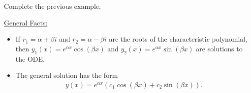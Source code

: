 \documentclass[12pt,a4paper]{article}
\newcounter{example}[section]
\begin{document}
	\vfill
	
\newpage

\begin{example}
Complete the previous example.
\end{example}

\newpage

\phantom{2}

\vfill

\underline{General Facts:}
	\begin{itemize}
	\item If $r_1 = \alpha + \beta i$ and $r_2 = \alpha - \beta i$ are the roots of the characteristic polynomial, then $y_1 (x) = e^{\alpha x} \cos (\beta x )$ and $y_2 (x) = e^{\alpha x} \sin (\beta x )$ are solutions to the ODE.
	\item The general solution has the form
		\begin{align*}
		y(x) = e^{\alpha x} (c_1 \cos (\beta x) + c_2 \sin (\beta x ) ) .
		\end{align*}
	\end{itemize}
	
\end{document}

